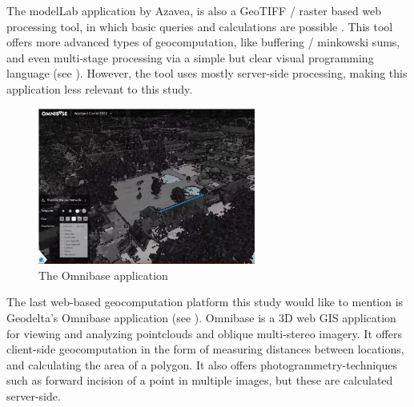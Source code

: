 The modelLab application by Azavea, is also a GeoTIFF / raster based web processing tool, in which basic queries and calculations are possible \citep{azavea_geotrellis_2022}. 
This tool offers more advanced types of geocomputation, like buffering / minkowski sums, and even multi-stage processing via a simple but clear visual programming language (see ). 
However, the tool uses mostly server-side processing, making this application less relevant to this study. 


\begin{figure}
  \centering
  \graphicspath{ {../../assets/images/background/geo-web/} }
  \includegraphics[width=270px]{omnibase.png}
  \caption{The Omnibase application \citep{geodelta_omnibase_2022}}
  \label{fig:omnibase}
\end{figure}

The last web-based geocomputation platform this study would like to mention is Geodelta's Omnibase application \citep{geodelta_omnibase_2022} (see ). 
Omnibase is a 3D web \ac{GIS} application for viewing and analyzing pointclouds and oblique multi-stereo imagery.
It offers client-side geocomputation in the form of measuring distances between locations, and calculating the area of a polygon.  
It also offers photogrammetry-techniques such as forward incision of a point in multiple images, but these are calculated server-side. 

